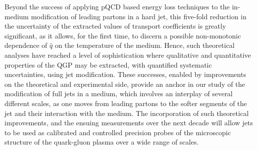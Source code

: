 Beyond the success of applying pQCD based energy loss techniques to the in-medium modification of leading partons in a hard jet, 
this five-fold reduction in the uncertainty of the 
extracted values of transport coefficients is greatly significant, as it allows, for the first time, 
to discern a possible non-monotonic dependence of $\hat{q}$ on the temperature of the medium. Hence, such theoretical analyses have reached a level of 
sophistication where qualitative and quantitative properties of the QGP may be extracted, with quantified systematic uncertainties, using jet modification. 
%
These successes, enabled by improvements on the theoretical and experimental side, provide an anchor in our study of the modification of full jets in a medium, which involves an interplay of several different scales, as one moves from leading partons to the softer segments of the jet and their interaction with the medium. The incorporation of such theoretical improvements, and the ensuing measurements 
over the next decade
will allow jets to be used as calibrated and controlled precision probes of the microscopic structure of the quark-gluon plasma over a wide range of scales.



